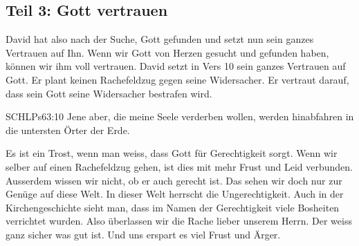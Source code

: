 \documentclass[14pt]{../../inc/mybib}
\begin{document}
    \subsection*{Teil 3: Gott vertrauen}
    \begin{block}
    David hat also nach der Suche, Gott gefunden und setzt nun sein ganzes Vertrauen auf Ihn.
    Wenn wir Gott von Herzen gesucht und gefunden haben, können wir ihm voll vertrauen. David setzt in Vers 10 sein ganzes Vertrauen auf Gott. Er plant keinen Rachefeldzug gegen seine Widersacher. Er vertraut darauf, dass sein Gott seine Widersacher bestrafen wird.
    \begin{bibelbox}{SCHL}{Ps}{63:10}
        Jene aber, die meine Seele verderben wollen, werden hinabfahren in die untersten Örter der Erde.
    \end{bibelbox}
    Es ist ein Trost, wenn man weiss, dass Gott für Gerechtigkeit sorgt. Wenn wir selber auf einen Rachefeldzug gehen, ist dies mit  mehr Frust und Leid verbunden. Ausserdem wissen wir nicht, ob er auch gerecht ist. Das sehen wir doch nur zur Genüge auf diese Welt. In dieser Welt herrscht die Ungerechtigkeit. Auch in der Kirchengeschichte sieht man, dass im Namen der Gerechtigkeit viele Bosheiten verrichtet wurden. Also überlassen wir die Rache lieber unserem Herrn. Der weiss ganz sicher was gut ist. Und uns erspart es viel Frust und Ärger. 
    \end{block}
\end{document}
